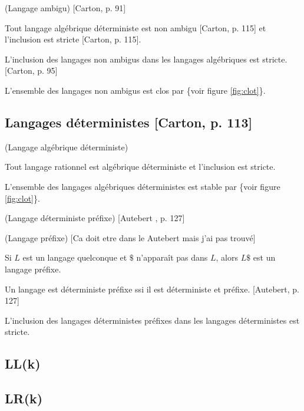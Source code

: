 \documentclass[../../agregation.tex]{subfiles}
\begin{document}
\begin{defn}
	(Langage ambigu) {[}Carton, p. 91{]}
\end{defn}

\begin{prop}
	Tout langage algébrique déterministe est non ambigu {[}Carton, p.
	115{]} et l'inclusion est stricte {[}Carton, p. 115{]}.
\end{prop}

\begin{prop}
	L'inclusion des langages non ambigus dans les langages algébriques
	est stricte. {[}Carton, p. 95{]}
\end{prop}

\begin{prop}
	L'ensemble des langages non ambigus est clos par \{voir figure \ref{fig:clot}\}.
\end{prop}

\subsection{Langages déterministes {[}Carton, p. 113{]}}
\begin{defn}
	(Langage algébrique déterministe)\end{defn}
\begin{prop}
	Tout langage rationnel est algébrique déterministe et l'inclusion
	est stricte.
\end{prop}

\begin{prop}
	L'ensemble des langages algébriques déterministes est stable par \{voir
	figure \ref{fig:clot}\}.\end{prop}
\begin{defn}
	(Langage déterministe préfixe) {[}Autebert , p. 127{]}
\end{defn}

\begin{defn}
	(Langage préfixe) {[}Ca doit etre dans le Autebert mais j'ai pas trouvé{]}\end{defn}
\begin{rem}
	Si $L$ est un langage quelconque et $\$$ n'apparaît pas dans $L$,
	alors $L\$$ est un langage préfixe.\end{rem}
\begin{prop}
	Un langage est déterministe préfixe ssi il est déterministe et préfixe.
	{[}Autebert, p. 127{]}
\end{prop}

\begin{prop}
	L'inclusion des langages déterministes préfixes dans les langages
	déterministes est stricte.
\end{prop}

\subsection{LL(k)}

\subsection{LR(k)}

\ifallthenelse{
	\dvts
}{}
\end{document}
